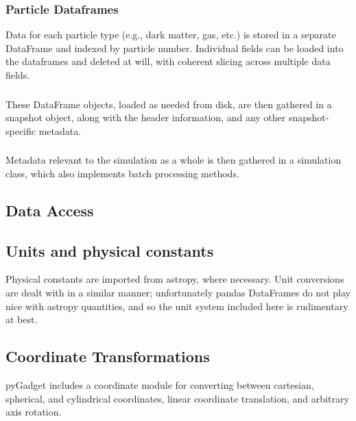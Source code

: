 \subsubsection{Particle Dataframes}
Data for each particle type (e.g., dark matter, gas, etc.) is stored in a separate DataFrame and indexed by particle number.  Individual fields can be loaded into the dataframes and deleted at will, with coherent slicing across multiple data fields.  
\subsubsection{}
These DataFrame objects, loaded as needed from disk, are then gathered in a snapshot object, along with the header information, and any other snapshot-specific metadata.  
\subsubsection{}
Metadata relevant to the simulation as a whole is then gathered in a simulation class, which also implements batch processing methods.

\subsection{Data Access}
\label{fileIO}

\subsection{Units and physical constants}
\label{units}
Physical constants are imported from astropy, where necessary.  Unit conversions are dealt with in a similar manner; unfortunately pandas DataFrames do not play nice with astropy quantities, and so the unit system included here is rudimentary at best.

\subsection{Coordinate Transformations}
\label{coordinates}
pyGadget includes a coordinate module for converting between cartesian, spherical, and cylindrical coordinates, linear coordinate translation, and arbitrary axis rotation.